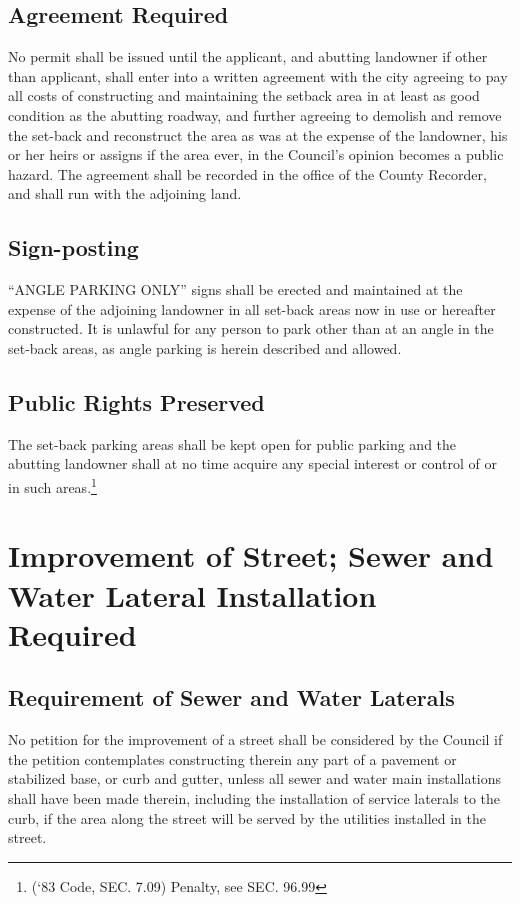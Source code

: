 \subsection{Agreement Required}
No permit shall be issued until the applicant, and abutting landowner if other than applicant, shall enter into a written agreement with the city agreeing to pay all costs of constructing and maintaining the setback area in at least as good condition as the abutting roadway, and further agreeing to demolish and remove the set-back and reconstruct the area as was at the expense of the landowner, his or her heirs or assigns if the area ever, in the Council’s opinion becomes a public hazard.  The agreement shall be recorded in the office of the County Recorder, and shall run with the adjoining land.
\subsection{Sign-posting}
“ANGLE PARKING ONLY” signs shall be erected and maintained at the expense of the adjoining landowner in all set-back areas now in use or hereafter constructed.  It is unlawful for any person to park other than at an angle in the set-back areas, as angle parking is herein described and allowed.
\subsection{Public Rights Preserved}
The set-back parking areas shall be kept open for public parking and the abutting landowner shall at no time acquire any special interest or control of or in such areas.\footnote{(‘83 Code, SEC. 7.09)  Penalty, see SEC. 96.99}

\section{Improvement of Street; Sewer and Water Lateral Installation Required}
\subsection{Requirement of Sewer and Water Laterals}
No petition for the improvement of a street shall be considered by the Council if the petition contemplates constructing therein any part of a pavement or stabilized base, or curb and gutter, unless all sewer and water main installations shall have been made therein, including the installation of service laterals to the curb, if the area along the street will be served by the utilities installed in the street.
